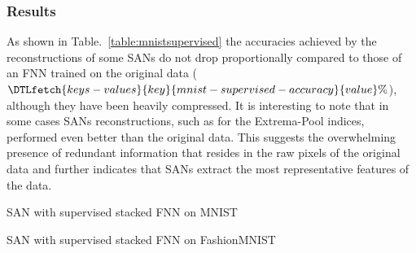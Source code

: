 \documentclass[journal]{IEEEtran}
\providecommand{\FILEPATH}{.}
\begin{document}
\subsubsection{Results}
As shown in Table.~\ref{table:mnistsupervised} the accuracies
achieved by the reconstructions of some SANs do not drop
proportionally compared to those of an FNN trained on the original
data
($\DTLfetch{keys-values}{key}{mnist-supervised-accuracy}{value}\%$),
although they have been heavily compressed.
It is interesting to note that in some cases SANs reconstructions,
such as for the Extrema-Pool indices, performed even better than the
original data.
This suggests the overwhelming presence of redundant information that
resides in the raw pixels of the original data and further indicates
that SANs extract the most representative features of the data.
\begin{table}[!t]
  \centering
  \caption{SAN with supervised stacked FNN on
  MNIST}\label{table:mnistsupervised}
  \begin{adjustbox}{width=\textwidth}
    
  \end{adjustbox}
\end{table}
\begin{table}[!t]
  \centering
  \caption{SAN with supervised stacked FNN on
  FashionMNIST}\label{table:fashionmnistsupervised}
  \begin{adjustbox}{width=\textwidth}
    
  \end{adjustbox}
\end{table}
\end{document}
